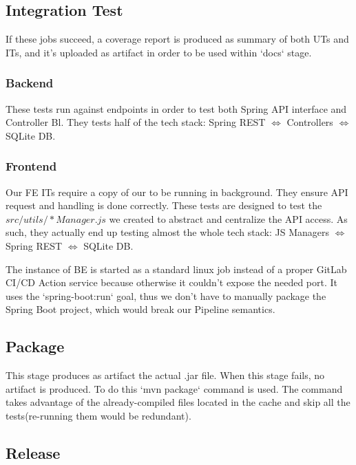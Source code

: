 \documentclass[a4paper,10pt]{scrartcl}
\begin{document}
\subsection{Integration Test}

If these jobs succeed, a coverage report is produced as summary of both UTs and ITs, and it's uploaded as artifact in order to be used within `docs` stage.

\subsubsection{Backend}

These tests run against endpoints in order to test both Spring API interface and Controller Bl. They tests half of the tech stack: Spring REST $\Leftrightarrow$ Controllers $\Leftrightarrow$ SQLite DB.

\subsubsection{Frontend}

Our FE ITs require a copy of our to be running in background. They ensure API request and handling is done correctly. These tests are designed to test the $src/utils/*Manager.js$ we created to abstract and centralize the API access. As such, they actually end up testing almost the whole tech stack: JS Managers $\Leftrightarrow$ Spring REST $\Leftrightarrow$ SQLite DB.

The instance of BE is started as a standard linux job instead of a proper GitLab CI/CD Action service because otherwise it couldn't expose the needed port. It uses the `spring-boot:run` goal, thus we don't have to manually package the Spring Boot project, which would break our Pipeline semantics.

\subsection{Package}

This stage produces as artifact the actual .jar file. When this stage fails, no artifact is produced.
To do this `mvn package` command is used. The command takes advantage of the already-compiled files located in the cache and skip all the tests(re-running them would be redundant).

\subsection{Release}
\end{document}
